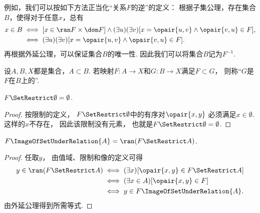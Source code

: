 例如，我们可以按如下方法正当化“关系\(F\)的逆”的定义：
根据子集公理，存在集合\(B\)，使得对于任意\(x\)，总有\begin{align*}
	x \in B
	&\iff
	[x \in \ran F \times \dom F]
	\land
	(\exists u)(\exists v)[x = \opair{u,v} \land \opair{v,u} \in F], \\
	&\iff
	(\exists u)(\exists v)[x = \opair{u,v} \land \opair{v,u} \in F].
\end{align*}
再根据外延公理，可以保证集合\(B\)的唯一性.
因此我们可以将集合\(B\)记为\(F^{-1}\).

\begin{definition}
设\(A,B,X\)都是集合，\(A \subset B\).
若映射\(F\colon A \to X\)和\(G\colon B \to X\)满足\(F \subset G\)，
则称“\(G\)是\(F\)在\(B\)上的”.
\end{definition}

\begin{theorem}
    \(F \SetRestrict \emptyset = \emptyset\).
    \begin{proof}
        按限制的定义，
        \(F\SetRestrict\emptyset\)中的有序对\(\opair{x,y}\)
        必须满足\(x\in\emptyset\).
        这样的\(x\)不存在，
        因此该限制没有元素，
        也就是\(F\SetRestrict\emptyset=\emptyset\).
    \end{proof}
\end{theorem}

\begin{theorem}
    \(F\ImageOfSetUnderRelation{A} = \ran(F \SetRestrict A)\).
    \begin{proof}
        任取\(y\)，
        由值域、限制和像的定义可得
        \begin{align*}
            y\in\ran(F\SetRestrict A)
            &\iff(\exists x)[\opair{x,y}\in F\SetRestrict A] \\
            &\iff(\exists x\in A)[\opair{x,y}\in F] \\
            &\iff y\in F\ImageOfSetUnderRelation{A}.
        \end{align*}
        由外延公理得到所需等式.
    \end{proof}
\end{theorem}

